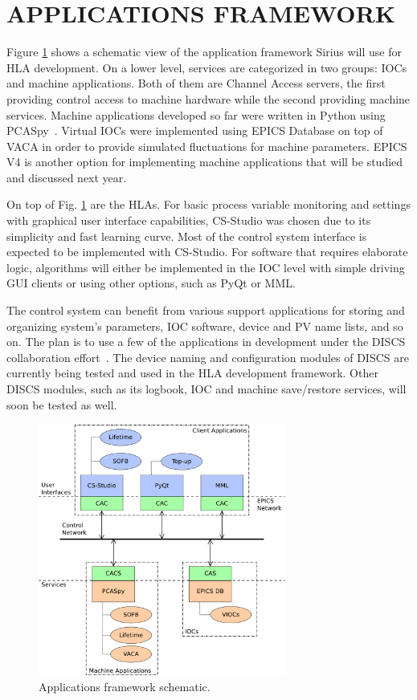 \documentclass[a4paper,
              ]{jacow}
\begin{document}
\section{APPLICATIONS FRAMEWORK}
Figure \ref{fig:f1} shows a schematic view of the application framework Sirius will use for HLA development. On a lower level, services are categorized in two groups: IOCs and machine applications. Both of them are Channel Access servers, the first providing control access to machine hardware while the second providing machine services. Machine applications developed so far were written in Python using PCASpy~\cite{pcaspy}. Virtual IOCs were implemented using EPICS Database on top of VACA in order to provide simulated fluctuations for machine parameters. EPICS V4 is another option for implementing machine applications that will be studied and discussed next year.

On top of Fig. \ref{fig:f1} are the HLAs. For basic process variable monitoring and settings with graphical user interface capabilities, CS-Studio was chosen due to its simplicity and fast learning curve. Most of the control system interface is expected to be implemented with CS-Studio. For software that requires elaborate logic, algorithms will either be implemented in the IOC level with simple driving GUI clients or using other options, such as PyQt or MML.

The control system can benefit from various support applications for storing and organizing system's parameters, IOC software, device and PV name lists, and so on. The plan is to use a few of the applications in development under the DISCS collaboration effort~\cite{discs_article,discs_openepics}. The device naming and configuration modules of DISCS are currently being tested and used in the HLA development framework. Other DISCS modules, such as its logbook, IOC  and machine save/restore services, will soon be tested as well.

\begin{figure}[!htb]
  \centering
  \includegraphics*[width=230pt]{WEPOPRPO22f1}
  \caption{Applications framework schematic.}
  \label{fig:f1}
\end{figure}
\end{document}
